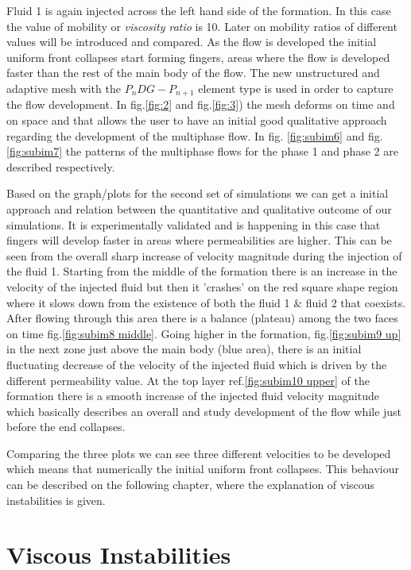 \documentclass[preprint,authoryear,12pt]{elsarticle}
\begin{document}
Fluid 1 is again injected across the left hand side of the formation. In this case the value of mobility or \textit{viscosity ratio} is 10. Later on mobility ratios of different values will be introduced and compared. As the flow is developed the initial uniform front collapses start forming fingers, areas where the flow is developed faster than the rest of the main body of the flow. The new unstructured and adaptive mesh with the $P_{n}DG-P_{n+1}$ element type is used in order to capture the flow development. In fig.\ref{fig:2} and fig.\ref{fig:3}) the mesh deforms on time and on space and that allows the user to have an initial good qualitative approach regarding the development of the multiphase flow. In fig. \ref{fig:subim6} and fig. \ref{fig:subim7} the patterns of the multiphase flows for the phase 1 and phase 2 are described respectively.

Based on the graph/plots for the second set of simulations we can get a initial approach and relation between the quantitative and qualitative outcome of our simulations. It is experimentally validated and is happening in this case that fingers will develop faster in areas where permeabilities are higher. This can be seen from the overall sharp increase of velocity magnitude during the injection of the fluid 1. Starting from the middle of the formation there is an increase in the velocity of the injected fluid but then it 'crashes' on the red square shape region where it slows down from the existence of both the fluid 1 \& fluid 2 that coexists. After flowing through this area there is a balance (plateau) among the two faces on time fig.\ref{fig:subim8 middle}. Going higher in the formation, fig.\ref{fig:subim9 up} in the next zone just above the main body (blue area), there is an initial fluctuating decrease  of the velocity of the injected fluid which is driven by the different permeability value. At the top layer ref.\ref{fig:subim10 upper} of the formation there is a smooth increase of the injected fluid velocity magnitude which basically describes an overall and study development of the flow while just before the end collapses. 

Comparing the three plots we can see three different velocities to be developed which means that numerically the initial uniform front collapses. This behaviour can be described on the following chapter, where the explanation of viscous instabilities is given.         
  

\section{Viscous Instabilities}\label{section:ViscousInstabilities}
\end{document}
